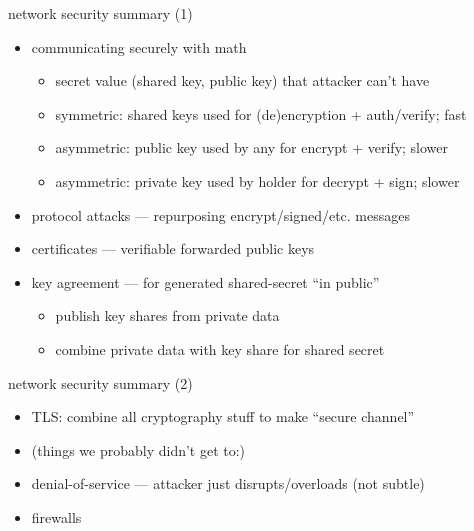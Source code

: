 \begin{frame}{network security summary (1)}
    \begin{itemize}
    \item communicating securely with math
        \begin{itemize}
        \item secret value (shared key, public key) that attacker can't have
        \item symmetric: shared keys used for (de)encryption + auth/verify; fast
        \item asymmetric: public key used by any for encrypt + verify; slower
        \item asymmetric: private key used by holder for decrypt + sign; slower
        \end{itemize}
    \item protocol attacks --- repurposing encrypt/signed/etc. messages
    \item certificates --- verifiable forwarded public keys 
    \item key agreement --- for generated shared-secret ``in public''
        \begin{itemize}
        \item publish key shares from private data
        \item combine private data with key share for shared secret
        \end{itemize}
    \end{itemize}
\end{frame}

\begin{frame}{network security summary (2)}
    \begin{itemize}
    \item TLS: combine all cryptography stuff to make ``secure channel''
    \vspace{.5cm}
    \item (things we probably didn't get to:)
    \item denial-of-service --- attacker just disrupts/overloads (not subtle)
    \item firewalls
    \end{itemize}
\end{frame}
